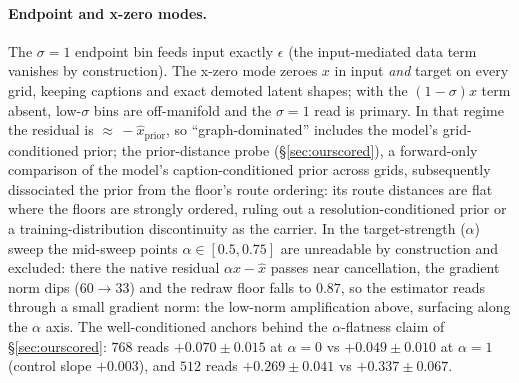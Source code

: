 \paragraph{Endpoint and x-zero modes.} The $\sigma{=}1$ endpoint bin feeds
input exactly $\epsilon$ (the input-mediated data term vanishes by
construction). The x-zero mode zeroes $x$ in input \emph{and} target on
every grid, keeping captions and exact demoted latent shapes; with the
$(1{-}\sigma)x$ term absent, low-$\sigma$ bins are off-manifold and the
$\sigma{=}1$ read is primary. In that regime the residual is
${\approx}\,{-}\hat x_{\mathrm{prior}}$, so ``graph-dominated'' includes
the model's grid-conditioned prior; the prior-distance probe
(\S\ref{sec:ourscored}), a forward-only comparison of the model's
caption-conditioned prior across grids, subsequently dissociated the
prior from the floor's route ordering: its route distances are flat
where the floors are strongly ordered, ruling out a
resolution-conditioned prior or a training-distribution discontinuity
as the carrier. In the target-strength ($\alpha$) sweep the
mid-sweep points $\alpha \in [0.5, 0.75]$ are unreadable by construction
and excluded: there the native residual $\alpha x - \hat x$ passes near
cancellation, the gradient norm dips ($60 \to 33$) and the redraw floor
falls to $0.87$, so the estimator reads through a small gradient norm:
the low-norm amplification above, surfacing along the $\alpha$ axis.
The well-conditioned anchors behind the $\alpha$-flatness claim of
\S\ref{sec:ourscored}: $768$ reads $+0.070 \pm 0.015$ at $\alpha{=}0$
vs $+0.049 \pm 0.010$ at $\alpha{=}1$ (control slope $+0.003$), and
$512$ reads $+0.269 \pm 0.041$ vs $+0.337 \pm 0.067$.

